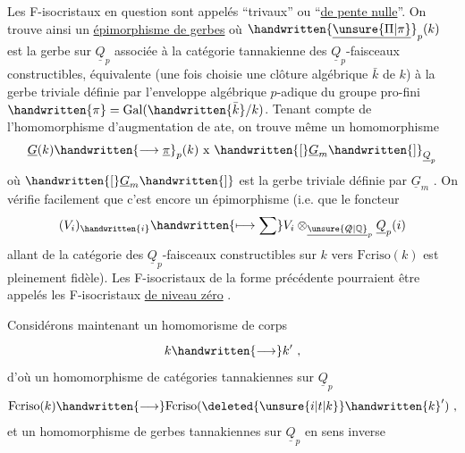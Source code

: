 Les F-isocristaux en question sont appelés ``trivaux'' ou ``\uline{de pente nulle}''. On trouve ainsi un \uline{épimorphisme de gerbes}
où $\handwritten{\underline{\unsure{\Pi|\pi}}}_p(k)$ est la gerbe sur $\underline{Q}_p$  associée à la catégorie tannakienne des $\underline{Q}_p$-faisceaux constructibles, équivalente  (une fois choisie une clôture algébrique $\bar{k}$ de $k$) à la gerbe triviale définie par l'enveloppe algébrique  $p$-adique du groupe pro-fini $\handwritten{\pi}=\operatorname{Gal}(\handwritten{\bar{k}}/k)$. Tenant compte de l'homomorphisme d'augmentation de ate, on trouve même un homomorphisme
\[
\underline{G}(k)\handwritten{\longrightarrow\underline{\pi}}_p(k)\ \mathrm{x}\ \handwritten{[}\underline{G}_m\handwritten{]}_{\underline{Q}_p}
\]
où $\handwritten{[}\underline{G}_m\handwritten{]}$ est la gerbe triviale définie par $\underline{G}_m$ . On vérifie facilement que c'est encore un épimorphisme (i.e. que le foncteur
\[
(V_i)_{\handwritten{i}}\handwritten{\longmapsto\sum}V_i\otimes_{\underline{\unsure{\not Q|\mathbb{Q}}}_p}\underline{Q}_p(i)
\]
allant de la catégorie des  $\underline{Q}_p$-faisceaux constructibles  sur $k$ vers $\mathrm{Fcriso}(k)$ est pleinement fidèle). Les F-isocristaux de la forme précédente pourraient être appelés les F-isocristaux \uline{de niveau zéro} .

 Considérons maintenant un homomorisme de corps\textsubscript{}
\[
k\handwritten{\longrightarrow}k'\ ,
\]
d'où un homomorphisme de catégories tannakiennes sur $\underline{Q}_p$
\[
\mathrm{Fcriso}(k)\handwritten{\longrightarrow}\mathrm{Fcriso}(\deleted{\unsure{i|t|k}}\handwritten{k}')\ ,
\]
et un homomorphisme de gerbes tannakiennes sur $\underline{Q}_p$ en sens inverse

